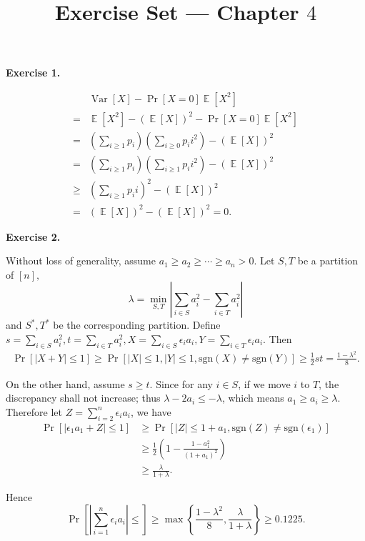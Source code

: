 \documentclass[a4paper]{article}
\title{Exercise Set --- Chapter $4$}
\date{}
\newenvironment{exercise}[1]{
	\par
	\noindent\textbf{Exercise #1.}\quad
}{
	\par
	\bigskip
}
\DeclareMathOperator{\E}{\mathbb E}
\DeclareMathOperator{\Var}{\mathrm{Var}}
\newcommand{\abs}[1]{\left| #1 \right|}
\newcommand{\pbra}[1]{\left( #1 \right)}
\newcommand{\cbra}[1]{\left\{ #1 \right\}}
\newcommand{\sbra}[1]{\left[ #1 \right]}
\newcommand{\sgn}{\text{sgn}}
\begin{document}
\maketitle

\begin{exercise}{1}
    \begin{align*}
        &\Var\sbra{X}-\Pr\sbra{X=0}\E\sbra{X^2}\\
        =&\E\sbra{X^2}-\pbra{\E\sbra{X}}^2-\Pr\sbra{X=0}\E\sbra{X^2}\\
        =&\pbra{\sum_{i\geq1}p_i}\pbra{\sum_{i\geq0}p_ii^2}-\pbra{\E\sbra{X}}^2\\
        =&\pbra{\sum_{i\geq1}p_i}\pbra{\sum_{i\geq1}p_ii^2}-\pbra{\E\sbra{X}}^2\\
        \geq&\pbra{\sum_{i\geq1}p_ii}^2-\pbra{\E\sbra{X}}^2\\
        =&\pbra{\E\sbra{X}}^2-\pbra{\E\sbra{X}}^2=0.
    \end{align*}
\end{exercise}

\begin{exercise}{2}
    Without loss of generality, assume $a_1\geq a_2\geq\cdots\geq a_n>0$.
    Let $S,T$ be a partition of $[n],$
    $$
    \lambda=\min_{S,T}\abs{\sum_{i\in S}a_i^2-\sum_{i\in T}a_i^2}
    $$
    and $S^*,T^*$ be the corresponding partition. Define $s=\sum_{i\in S}a_i^2,t=\sum_{i\in T}a_i^2,X=\sum_{i\in S}\epsilon_ia_i,
    Y=\sum_{i\in T}\epsilon_ia_i$. Then 
    \begin{align*}
        \Pr\sbra{\abs{X+Y}\leq1}\geq\Pr\sbra{\abs{X}\leq1,\abs{Y}\leq1,\sgn(X)\neq\sgn(Y)}\geq\frac12st=\frac{1-\lambda^2}8.
    \end{align*}
    
    On the other hand, assume $s\geq t$. Since for any $i\in S$, if we move $i$ to $T$, the discrepancy shall not increase; thus
    $\lambda-2a_i\leq-\lambda$, which means $a_1\geq a_i\geq\lambda$. Therefore let $Z=\sum_{i=2}^n\epsilon_ia_i$, we have
    \begin{align*}
        \Pr\sbra{\abs{\epsilon_1a_1+Z}\leq1}
        &\geq\Pr\sbra{\abs{Z}\leq1+a_1,\sgn(Z)\neq\sgn(\epsilon_1)}\\
        &\geq\frac12\pbra{1-\frac{1-a_1^2}{(1+a_1)^2}}\\
        &\geq\frac\lambda{1+\lambda}.
    \end{align*}

    Hence
    $$
    \Pr\sbra{\abs{\sum_{i=1}^n\epsilon_ia_i}\leq}\geq\max\cbra{\frac{1-\lambda^2}8,\frac\lambda{1+\lambda}}
    \geq0.1225.
    $$
\end{exercise}
\end{document}
